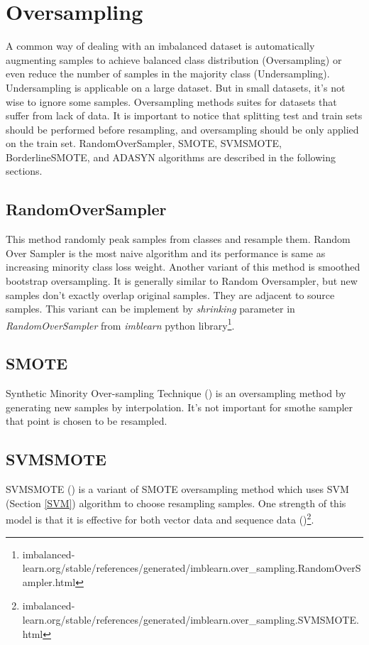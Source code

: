 \section{Oversampling}
\label{lr:oversampling}
A common way of dealing with an imbalanced dataset is automatically augmenting samples to achieve balanced class distribution (Oversampling) or even reduce the number of samples in the majority class (Undersampling). Undersampling is applicable on a large dataset. But in small datasets, it's not wise to ignore some samples. Oversampling methods suites for datasets that suffer from lack of data. It is important to notice that splitting test and train sets should be performed before resampling, and oversampling should be only applied on the train set. RandomOverSampler, SMOTE, SVMSMOTE, BorderlineSMOTE, and ADASYN algorithms are described in the following sections.

\subsection{RandomOverSampler} 
This method randomly peak samples from classes and resample them. Random Over Sampler is the most naive algorithm and its performance is same as increasing minority class loss weight. Another variant of this method is smoothed bootstrap oversampling. It is generally similar to Random Oversampler, but new samples don't exactly overlap original samples. They are adjacent to source samples. This variant can be implement by \textit{shrinking} parameter in \textit{RandomOverSampler} from \textit{imblearn} python library\footnote{imbalanced-learn.org/stable/references/generated/imblearn.over\_sampling.RandomOverSampler.html}. 
	
\subsection{SMOTE}
Synthetic Minority Over-sampling Technique (\cite{smothe}) is an oversampling method by generating new samples by interpolation. It's not important for smothe sampler that point is chosen to be resampled. 
	
\subsection{SVMSMOTE } 
SVMSMOTE (\cite{svmsmothe}) is a variant of SMOTE oversampling method which uses SVM (Section \ref{SVM}) algorithm to choose resampling samples. One strength of this model is that it is effective for both vector data and sequence data (\cite{svmsmothe})\footnote{imbalanced-learn.org/stable/references/generated/imblearn.over\_sampling.SVMSMOTE.html}.
	
